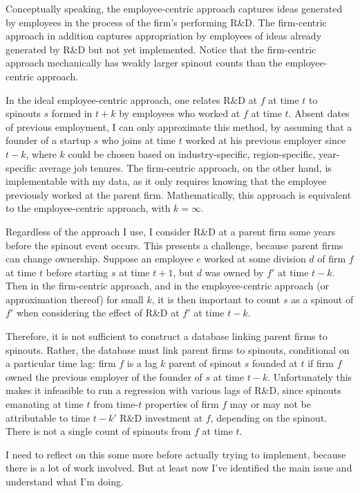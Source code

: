 \documentclass[11pt,english]{article}
\theoremstyle{remark}
\begin{document}
Conceptually speaking, the employee-centric approach captures ideas generated by employees in the process of the firm's performing R\&D. The firm-centric approach in addition captures appropriation by employees of ideas already generated by R\&D but not yet implemented. Notice that the firm-centric approach mechanically has weakly larger spinout counts than the employee-centric approach. 

In the ideal employee-centric approach, one relates R\&D at $f$ at time $t$ to spinouts $s$ formed in $t+k$ by employees who worked at $f$ at time $t$. Absent dates of previous employment, I can only approximate this method, by assuming that a founder of a startup $s$ who joins at time $t$ worked at his previous employer since $t-k$, where $k$ could be chosen based on industry-specific, region-specific, year-specific average job tenures. The firm-centric approach, on the other hand, is implementable with my data, as it only requires knowing that the employee previously worked at the parent firm. Mathematically, this approach is equivalent to the employee-centric approach, with $k = \infty$. 

Regardless of the approach I use, I consider R\&D at a parent firm some years before the spinout event occurs. This presents a challenge, because parent firms can change ownership. Suppose an employee $e$ worked at some division $d$ of firm $f$ at time $t$ before starting $s$ at time $t+1$, but $d$ was owned by $f'$ at time $t-k$. Then in the firm-centric approach, and in the employee-centric approach (or approximation thereof) for small $k$, it is then important to count $s$ as a spinout of $f'$ when considering the effect of R\&D at $f'$ at time $t-k$. 

Therefore, it is not sufficient to construct a database linking parent firms to spinouts. Rather, the database must link parent firms to spinouts, conditional on a particular time lag: firm $f$ is a lag $k$ parent of spinout $s$ founded at $t$ if firm $f$ owned the previous employer of the founder of $s$ at time $t - k$. Unfortunately this makes it infeasible to run a regression with various lags of R\&D, since spinouts emanating at time $t$ from time-$t$ properties of firm $f$ may or may not be attributable to time $t-k'$ R\&D investment at $f$, depending on the spinout. There is not a single count of spinouts from $f$ at time $t$. 

I need to reflect on this some more before actually trying to implement, because there is a lot of work involved. But at least now I've identified the main issue and understand what I'm doing. 
\end{document}
